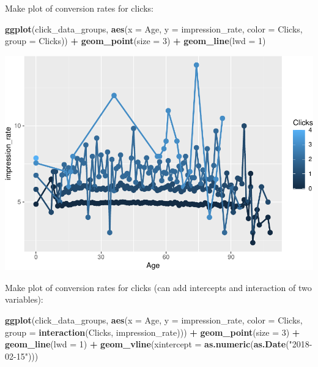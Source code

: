 \documentclass[]{book}
\newenvironment{Shaded}{\begin{snugshade}}{\end{snugshade}}
\newcommand{\DataTypeTok}[1]{\textcolor[rgb]{0.13,0.29,0.53}{#1}}
\newcommand{\DecValTok}[1]{\textcolor[rgb]{0.00,0.00,0.81}{#1}}
\newcommand{\KeywordTok}[1]{\textcolor[rgb]{0.13,0.29,0.53}{\textbf{#1}}}
\newcommand{\NormalTok}[1]{#1}
\newcommand{\OperatorTok}[1]{\textcolor[rgb]{0.81,0.36,0.00}{\textbf{#1}}}
\newcommand{\StringTok}[1]{\textcolor[rgb]{0.31,0.60,0.02}{#1}}
\begin{document}
Make plot of conversion rates for clicks:

\begin{Shaded}
\begin{Highlighting}[]
\KeywordTok{ggplot}\NormalTok{(click_data_groups,}
       \KeywordTok{aes}\NormalTok{(}\DataTypeTok{x =}\NormalTok{ Age,}
           \DataTypeTok{y =}\NormalTok{ impression_rate,}
           \DataTypeTok{color =}\NormalTok{ Clicks,}
           \DataTypeTok{group =}\NormalTok{ Clicks)) }\OperatorTok{+}
\StringTok{  }\KeywordTok{geom_point}\NormalTok{(}\DataTypeTok{size =} \DecValTok{3}\NormalTok{) }\OperatorTok{+}
\StringTok{  }\KeywordTok{geom_line}\NormalTok{(}\DataTypeTok{lwd =} \DecValTok{1}\NormalTok{)}
\end{Highlighting}
\end{Shaded}

\includegraphics{code4stem_files/figure-latex/visualize clicks-1.pdf}

Make plot of conversion rates for clicks
(can add intercepts and interaction of two variables):

\begin{Shaded}
\begin{Highlighting}[]
\KeywordTok{ggplot}\NormalTok{(click_data_groups,}
       \KeywordTok{aes}\NormalTok{(}\DataTypeTok{x =}\NormalTok{ Age,}
           \DataTypeTok{y =}\NormalTok{ impression_rate,}
           \DataTypeTok{color =}\NormalTok{ Clicks,}
           \DataTypeTok{group =} \KeywordTok{interaction}\NormalTok{(Clicks, impression_rate))) }\OperatorTok{+}
\StringTok{  }\KeywordTok{geom_point}\NormalTok{(}\DataTypeTok{size =} \DecValTok{3}\NormalTok{) }\OperatorTok{+}
\StringTok{  }\KeywordTok{geom_line}\NormalTok{(}\DataTypeTok{lwd =} \DecValTok{1}\NormalTok{) }\OperatorTok{+}
\StringTok{  }\KeywordTok{geom_vline}\NormalTok{(}\DataTypeTok{xintercept =} \KeywordTok{as.numeric}\NormalTok{(}\KeywordTok{as.Date}\NormalTok{(}\StringTok{"2018-02-15"}\NormalTok{))) }
\end{Highlighting}
\end{Shaded}
\end{document}
